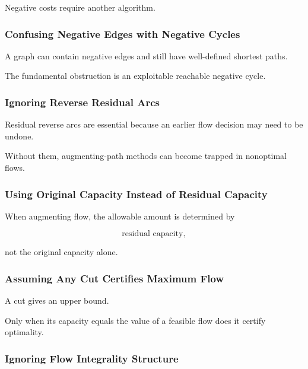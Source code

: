 Negative costs require another algorithm.

\subsubsection{Confusing Negative Edges with Negative Cycles}

A graph can contain negative edges and still have well-defined shortest
paths.

The fundamental obstruction is an exploitable reachable negative cycle.

\subsubsection{Ignoring Reverse Residual Arcs}

Residual reverse arcs are essential because an earlier flow decision may
need to be undone.

Without them, augmenting-path methods can become trapped in nonoptimal
flows.

\subsubsection{Using Original Capacity Instead of Residual Capacity}

When augmenting flow, the allowable amount is determined by

\[
\boxed{
\text{residual capacity},
}
\]

not the original capacity alone.

\subsubsection{Assuming Any Cut Certifies Maximum Flow}

A cut gives an upper bound.

Only when its capacity equals the value of a feasible flow does it certify
optimality.

\subsubsection{Ignoring Flow Integrality Structure}

